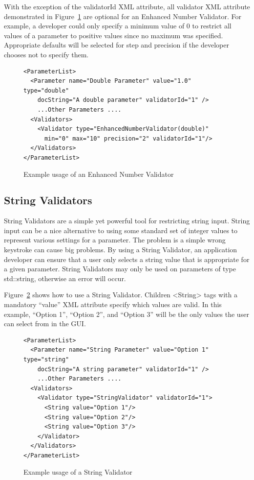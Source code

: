 With the exception of the validatorId XML attribute, all validator XML attribute demonstrated in Figure~\ref{EnhancedNumberValidatorXML}
are optional for an Enhanced Number Validator. For example, a developer could only specify a minimum value of 0 to restrict all 
values of a parameter to positive values since no maximum was specified.
Appropriate defaults will be selected for step and precision if the developer chooses not to specify them.
\begin{figure}
\centering
{\footnotesize
\begin{Verbatim}
<ParameterList>
  <Parameter name="Double Parameter" value="1.0" type="double" 
    docString="A double parameter" validatorId="1" />
    ...Other Parameters ....
  <Validators>
    <Validator type="EnhancedNumberValidator(double)" 
      min="0" max="10" precision="2" validatorId="1"/>
  </Validators>
</ParameterList>
\end{Verbatim}
}
\caption{Example usage of an Enhanced Number Validator}
\label{EnhancedNumberValidatorXML}
\end{figure}

\subsection{String Validators}
String Validators are a simple yet powerful tool for restricting string input. String input can be a nice alternative to
using some standard set of integer values to represent various settings for a parameter. The problem is a simple wrong 
keystroke can cause big problems. By using a String Validator, an application developer can ensure that a user 
only selects a string value that is appropriate for a given parameter. 
String Validators may only be used on parameters of type std::string, otherwise an error will occur.

Figure~\ref{StringValidatorXML} shows how to use a String Validator. 
Children <String> tags with a mandatory ``value'' XML attribute specify which values are 
valid.  In this example, ``Option 1'', ``Option 2'', and ``Option 3'' will be the only values the user can select from in the GUI.
\begin{figure}
\centering
{\footnotesize
\begin{Verbatim}
<ParameterList>
  <Parameter name="String Parameter" value="Option 1" type="string" 
    docString="A string parameter" validatorId="1" />
    ...Other Parameters ....
  <Validators>
    <Validator type="StringValidator" validatorId="1">
      <String value="Option 1"/> 
      <String value="Option 2"/> 
      <String value="Option 3"/> 
    </Validator>
  </Validators>
</ParameterList>
\end{Verbatim}
}
\caption{Example usage of a String Validator}
\label{StringValidatorXML}
\end{figure}


